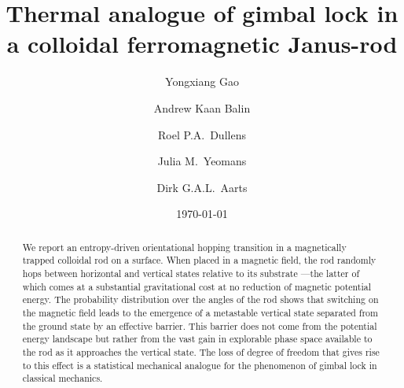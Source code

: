 \documentclass[aps,prl,twocolumn,superscriptaddress]{revtex4-1}
\begin{document}

\title{Thermal analogue of gimbal lock in a colloidal ferromagnetic Janus-rod}


\author{Yongxiang Gao}
\author{Andrew Kaan Balin}
\author{Roel P.A.\ Dullens}
\author{Julia M.\ Yeomans}
\author{Dirk G.A.L.\ Aarts}



\date{\today}

\begin{abstract}
We report an entropy-driven orientational hopping transition in a magnetically trapped colloidal rod on a surface. When placed in a magnetic field, the rod randomly hops between horizontal and vertical states relative to its substrate ---the latter of which comes at a substantial gravitational cost at no reduction of magnetic potential energy. The probability distribution over the angles of the rod shows that switching on the magnetic field leads to the emergence of a metastable vertical state separated from the ground state by an effective barrier. This barrier does not come from the potential energy landscape but rather from the vast gain in explorable phase space available to the rod as it approaches the vertical state. The loss of degree of freedom that gives rise to this effect is a statistical mechanical analogue for the phenomenon of gimbal lock in classical mechanics.\end{abstract}
\end{document}
